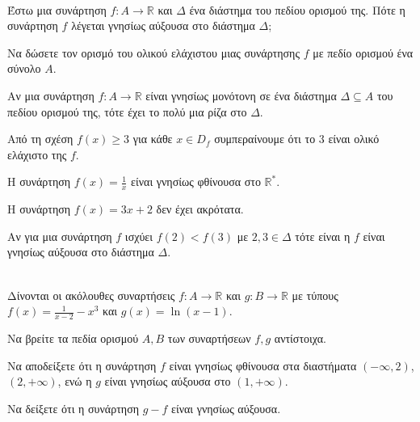\documentclass[twoside,nofonts,ektypwsh]{frontisthrio-diag}
\begin{document}
\begin{thema}
\item \mbox{}\\\vspace{-5mm}
\begin{erwthma}
\item Έστω μια συνάρτηση $ f:A\to\mathbb{R} $ και $ \varDelta $ ένα διάστημα του πεδίου ορισμού της. Πότε η συνάρτηση $ f $ λέγεται γνησίως αύξουσα στο διάστημα $ \varDelta $;
\item Να δώσετε τον ορισμό του ολικού ελάχιστου μιας συνάρτησης $ f $ με πεδίο ορισμού ένα σύνολο $ A $.\\
\item \swstolathospan
\begin{alist}
\item Αν μια συνάρτηση $ f:A\to\mathbb{R} $ είναι γνησίως μονότονη σε ένα διάστημα $ \varDelta\subseteq A $ του πεδίου ορισμού της, τότε έχει το πολύ μια ρίζα στο $ \varDelta $.
\item Από τη σχέση $ f(x)\geq 3 $ για κάθε $ x\in D_f $ συμπεραίνουμε ότι το $ 3 $ είναι ολικό ελάχιστο της $ f $.
\item Η συνάρτηση $ f(x)=\frac{1}{x} $ είναι γνησίως φθίνουσα στο $ \mathbb{R}^* $.
\item Η συνάρτηση $ f(x)=3x+2 $ δεν έχει ακρότατα.
\item Αν για μια συνάρτηση $ f $ ισχύει $ f(2)<f(3) $ με $ 2,3\in\varDelta $ τότε είναι η $ f $ είναι γνησίως αύξουσα στο διάστημα $ \varDelta $.
\end{alist}
\end{erwthma}
\item \mbox{}\\
Δίνονται οι ακόλουθες συναρτήσεις $ f:A\to\mathbb{R} $ και $ g:B\to\mathbb{R} $ με τύπους $ f(x)=\frac{1}{x-2}-x^3 $ και $ g(x)=\ln{(x-1)} $.
\begin{erwthma}
\item Να βρείτε τα πεδία ορισμού $ A,B $ των συναρτήσεων $ f,g $ αντίστοιχα.
\item Να αποδείξετε ότι η συνάρτηση $ f $ είναι γνησίως φθίνουσα στα διαστήματα $ (-\infty,2) $, $ (2,+\infty) $, ενώ η $ g $ είναι γνησίως αύξουσα στο $ (1,+\infty) $.
\item Να δείξετε ότι η συνάρτηση $ g-f $ είναι γνησίως αύξουσα.\\
\end{erwthma}

\end{thema}
\end{document}
